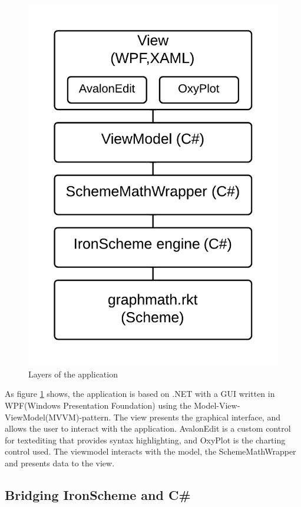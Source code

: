 \documentclass[a4paper,12pt]{article}
\begin{document}
\begin{figure}[h]
	\centering
	\includegraphics[scale=0.23]{MultiParadigmeBlocks}
	\caption{Layers of the application}
    \label{fig:layers}
\end{figure}

As figure \ref{fig:layers} shows, the application is based on .NET with a GUI written in WPF(Windows Presentation Foundation) using the Model-View-ViewModel(MVVM)-pattern. The view presents the graphical interface, and allows the user to interact with the application. AvalonEdit is a custom control for textediting that provides syntax highlighting, and OxyPlot is the charting control used. The viewmodel interacts with the model, the SchemeMathWrapper and presents data to the view.

\subsection{Bridging IronScheme and C\#}
 
\end{document}
